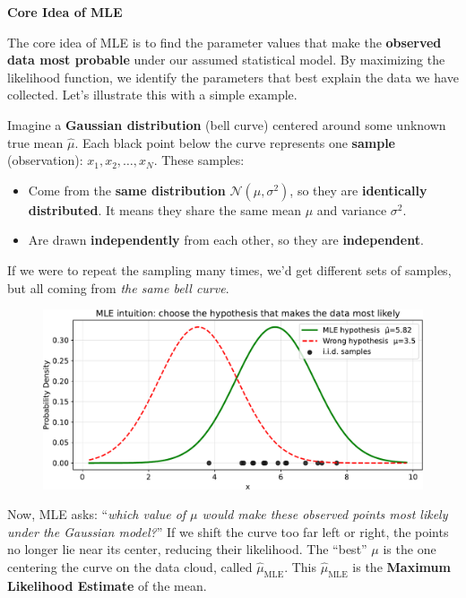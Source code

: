 \highspace
\begin{flushleft}
    \textcolor{Green3}{ \textbf{Core Idea of MLE}}
\end{flushleft}
The core idea of MLE is to find the parameter values that make the \textbf{observed data most probable} under our assumed statistical model. By maximizing the likelihood function, we identify the parameters that best explain the data we have collected. Let's illustrate this with a simple example.

\highspace
Imagine a \textbf{Gaussian distribution} (bell curve) centered around some unknown true mean $\hat{\mu}$. Each black point below the curve represents one \textbf{sample} (observation): $x_{1}, x_{2}, \ldots, x_{N}$. These samples:
\begin{itemize}
    \item Come from the \textbf{same distribution} $\mathcal{N}\left(\mu, \sigma^{2}\right)$, so they are \textbf{identically distributed}. It means they share the same mean $\mu$ and variance $\sigma^{2}$.
    \item Are drawn \textbf{independently} from each other, so they are \textbf{independent}.
\end{itemize}
If we were to repeat the sampling many times, we'd get different sets of samples, but all coming from \emph{the same bell curve}.

\newpage

\begin{figure}[!htp]
    \centering
    \includegraphics[width=\textwidth]{img/maximum-likelihood-estimation/gaussian-samples.pdf}
\end{figure}

\noindent
Now, MLE asks: ``\emph{which value of $\mu$ would make these observed points most likely under the Gaussian model?}'' If we shift the curve too far left or right, the points no longer lie near its center, reducing their likelihood. The ``best'' $\mu$ is the one centering the curve on the data cloud, called $\hat{\mu}_{\text{MLE}}$. This $\hat{\mu}_{\text{MLE}}$ is the \textbf{Maximum Likelihood Estimate} of the mean.

